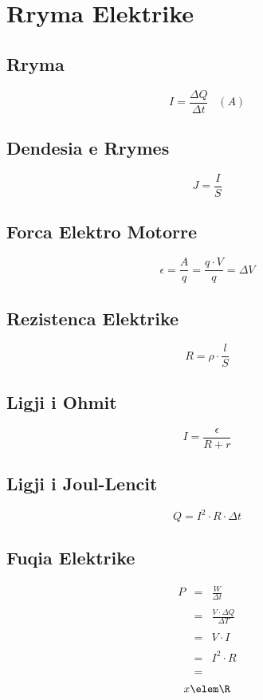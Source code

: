 \documentclass[a4paper, twocolumn]{article}
\begin{document}
\section{Rryma Elektrike}
\subsection{Rryma}
\[
	I=\frac{\Delta Q}{\Delta t}\;\;\; (A)
\] 
\subsection{Dendesia e Rrymes}
\[
J=\frac{I}{S}
\] 
\subsection{Forca Elektro Motorre}
\[
	\epsilon = \frac{A}{q}=\frac{q\cdot V}{q}=\Delta V
\] 
\subsection{Rezistenca Elektrike}
\[
R=\rho \cdot \frac{l}{S}
\] 
\subsection{Ligji i Ohmit}
\[
	I=\frac{\epsilon}{R+r}
\] 
\subsection{Ligji i Joul-Lencit}
\[
Q=I^2\cdot R\cdot \Delta t
\] 
\subsection{Fuqia Elektrike}
\begin{eqnarray*}
	P&=&\frac{W}{\Delta t}\\
	\\
	 &=&\frac{V\cdot \Delta Q}{\Delta T}\\
	 \\
	 &=&V\cdot I\\
	 \\
	 &=&I^2 \cdot R\\
	 \\
	 &=&
\end{eqnarray*}
\[
x \elem \R
\] 
\end{document}
